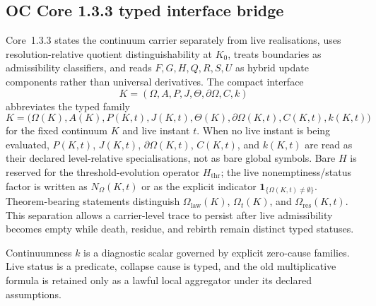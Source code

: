 
\subsection{OC Core 1.3.3 typed interface bridge}
\label{sec:oc133-model-scientific-closure-bridge}

Core~1.3.3 states the continuum carrier separately from live realisations,
uses resolution-relative quotient distinguishability at \(K_0\), treats
boundaries as admissibility classifiers, and reads \(F,G,H,Q,R,S,U\) as
hybrid update components rather than universal derivatives.  The compact
interface
\[
K=(\Omega,A,P,J,\Theta,\partial\Omega,C,k)
\]
abbreviates the typed family
\[
K=\big(\Omega(K),A(K),P(K,t),J(K,t),\Theta(K),
       \partial\Omega(K,t),C(K,t),k(K,t)\big)
\]
for the fixed continuum \(K\) and live instant \(t\).  When no live instant is
being evaluated, \(P(K,t)\), \(J(K,t)\), \(\partial\Omega(K,t)\), \(C(K,t)\),
and \(k(K,t)\) are read as their declared level-relative specialisations, not
as bare global symbols.  Bare \(H\) is reserved for the threshold-evolution
operator \(H_{\mathrm{thr}}\); the live nonemptiness/status factor is written as
\(N_{\Omega}(K,t)\) or as the explicit indicator
\(\mathbf{1}_{\{\Omega(K,t)\neq\emptyset\}}\).  Theorem-bearing statements distinguish
\(\Omega_{\mathrm{law}}(K)\), \(\Omega_t(K)\), and
\(\Omega_{\mathrm{res}}(K,t)\).  This separation allows a carrier-level trace
to persist after live admissibility becomes empty while death, residue, and
rebirth remain distinct typed statuses.

Continuumness \(k\) is a diagnostic scalar governed by explicit zero-cause
families.  Live status is a predicate, collapse cause is typed, and the old
multiplicative formula is retained only as a lawful local aggregator under its
declared assumptions.

